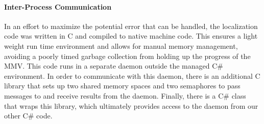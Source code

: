 \paragraph{Inter-Process Communication}
In an effort to maximize the potential error that can be handled, the localization code was written in C and compiled to native machine code.  This ensures a light weight run time environment and allows for manual memory management, avoiding a poorly timed garbage collection from holding up the progress of the MMV.  This code runs in a separate daemon outside the managed C\# environment.  In order to communicate with this daemon, there is an additional C library that sets up two shared memory spaces and two semaphores to pass messages to and receive results from the daemon.  Finally, there is a C\# class that wraps this library, which ultimately provides access to the daemon from our other C\# code.
